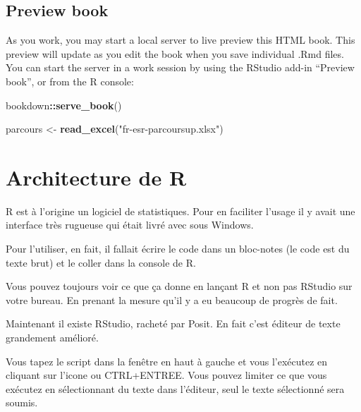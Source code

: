 \documentclass[
]{book}
\newenvironment{Shaded}{\begin{snugshade}}{\end{snugshade}}
\newcommand{\FunctionTok}[1]{\textcolor[rgb]{0.13,0.29,0.53}{\textbf{#1}}}
\newcommand{\NormalTok}[1]{#1}
\newcommand{\OtherTok}[1]{\textcolor[rgb]{0.56,0.35,0.01}{#1}}
\newcommand{\SpecialCharTok}[1]{\textcolor[rgb]{0.81,0.36,0.00}{\textbf{#1}}}
\newcommand{\StringTok}[1]{\textcolor[rgb]{0.31,0.60,0.02}{#1}}
\begin{document}
\hypertarget{preview-book}{%
\section{Preview book}\label{preview-book}}

As you work, you may start a local server to live preview this HTML book. This preview will update as you edit the book when you save individual .Rmd files. You can start the server in a work session by using the RStudio add-in ``Preview book'', or from the R console:

\begin{Shaded}
\begin{Highlighting}[]
\NormalTok{bookdown}\SpecialCharTok{::}\FunctionTok{serve\_book}\NormalTok{()}
\end{Highlighting}
\end{Shaded}

\begin{Shaded}
\begin{Highlighting}[]
\NormalTok{parcours }\OtherTok{\textless{}{-}} \FunctionTok{read\_excel}\NormalTok{(}\StringTok{"fr{-}esr{-}parcoursup.xlsx"}\NormalTok{)}
\end{Highlighting}
\end{Shaded}

\hypertarget{architecture-de-r}{%
\chapter{Architecture de R}\label{architecture-de-r}}

R est à l'origine un logiciel de statistiques. Pour en faciliter l'usage il y
avait une interface très rugueuse qui était livré avec sous Windows.

Pour l'utiliser, en fait, il fallait écrire le code dans un bloc-notes (le code
est du texte brut) et le coller dans la console de R.

Vous pouvez toujours voir ce que ça donne en lançant R et non pas RStudio
sur votre bureau. En prenant la mesure qu'il y a eu beaucoup de progrès de fait.

Maintenant il existe RStudio, racheté par Posit. En fait c'est éditeur de texte
grandement amélioré.

Vous tapez le script dans la fenêtre en haut à gauche et vous l'exécutez en
cliquant sur l'icone ou CTRL+ENTREE. Vous pouvez limiter ce que vous exécutez
en sélectionnant du texte dans l'éditeur, seul le texte sélectionné sera soumis.
\end{document}
